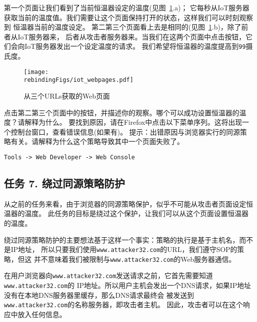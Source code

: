 第一个页面让我们看到了当前恒温器设定的温度(见图~\ref{rebinding:fig:webpages}.a)；
它每秒从IoT服务器获取当前的温度值。我们需要让这个页面保持打开的状态，这样我们可以时刻观察到
恒温器当前的温度设定。
第二第三个页面看上去是相同的(见图~\ref{rebinding:fig:webpages}.b)，除了前者从IoT服务器来，
后者从攻击者服务器来。当我们在这两个页面中点击按钮，它们会向IoT服务器发出一个设定温度的请求。
我们希望将恒温器的温度提高到\texttt{99}摄氏度。



\begin{figure}[htb]
\begin{center}
\texttt{[image: \\rebindingFigs/iot\_webpages.pdf]}
\end{center}
\caption{从三个URLs获取的Web页面}
\label{rebinding:fig:webpages}
\end{figure}
 

点击第二第三个页面中的按钮，并描述你的观察。哪个可以成功设置恒温器的温度？请解释为什么。
要找到原因，请在Firefox中点击以下菜单序列。这将出现一个控制台窗口，查看错误信息(如果有)。
提示：出错原因与浏览器实行的同源策略有关。请解释为什么这个策略导致其中一个页面失败了。

\begin{lstlisting}
Tools -> Web Developer -> Web Console
\end{lstlisting}
  



\subsection{任务 7. 绕过同源策略防护}


从之前的任务来看，由于浏览器的同源策略保护，似乎不可能从攻击者页面设定恒温器的温度。
此任务的目标是绕过这个保护，让我们可以从这个页面设置恒温器的温度。


绕过同源策略防护的主要想法基于这样一个事实：策略的执行是基于主机名，而不是IP地址，
所以只要我们使用\texttt{www.attacker32.com}的URL，我们遵守SOP的策略，但这
并不意味着我们被限制与\texttt{www.attacker32.com}的Web服务器通信。


在用户浏览器向\texttt{www.attacker32.com}发送请求之前，它首先需要知道\texttt{www.attacker32.com}的
IP地址。所以用户主机会发出一个DNS请求，如果IP地址没有在本地DNS服务器里缓存，那么DNS请求最终会
被发送到\texttt{www.attacker32.com}的名称服务器，即攻击者主机。
因此，攻击者可以在这个响应中放入任何信息。



